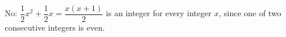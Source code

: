 $\boxed{\text{No}}$: $\dfrac12x^2+\dfrac12x=\dfrac{x(x+1)}2$ is an integer for every integer $x$, since one of two consecutive integers is even.
